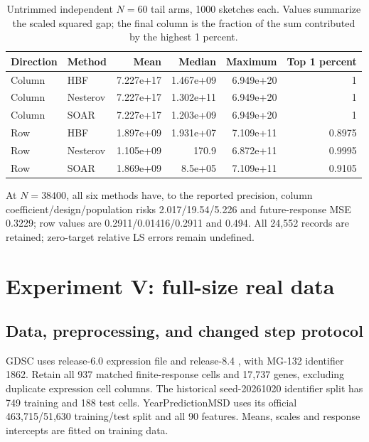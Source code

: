 \documentclass[11pt,a4paper,leqno]{article}
\numberwithin{equation}{section}
\numberwithin{figure}{section}
\numberwithin{table}{section}
\theoremstyle{plain}
\theoremstyle{definition}
\theoremstyle{remark}
\begin{document}
\begin{table}[!htbp]\centering\small
\caption{Untrimmed independent $N=60$ tail arms, 1000 sketches each. Values summarize the scaled squared gap; the final column is the fraction of the sum contributed by the highest 1 percent.}
\label{tab:exp4_tails}
\begin{tabular}{llrrrr}\toprule
Direction & Method & Mean & Median & Maximum & Top 1 percent \\\midrule
Column & HBF & 7.227e+17 & 1.467e+09 & 6.949e+20 & 1 \\
Column & Nesterov & 7.227e+17 & 1.302e+11 & 6.949e+20 & 1 \\
Column & SOAR & 7.227e+17 & 1.203e+09 & 6.949e+20 & 1 \\
Row & HBF & 1.897e+09 & 1.931e+07 & 7.109e+11 & 0.8975 \\
Row & Nesterov & 1.105e+09 & 170.9 & 6.872e+11 & 0.9995 \\
Row & SOAR & 1.869e+09 & 8.5e+05 & 7.109e+11 & 0.9105 \\
\bottomrule\end{tabular}
\end{table}


At $N=38400$, all six methods have, to the reported precision, column
coefficient/design/population risks 2.017/19.54/5.226 and future-response
MSE 0.3229; row values are 0.2911/0.01416/0.2911 and 0.494.
All 24,552 records are retained; zero-target relative LS errors remain undefined.



\section{Experiment V: full-size real data}
\label{supp:sec:native_exp5}
\subsection{Data, preprocessing, and changed step protocol}
\label{supp:subsec:real_protocol}
GDSC uses release-6.0 expression file
 and release-8.4
, with MG-132
identifier 1862. Retain all 937 matched finite-response cells and 17,737
genes, excluding duplicate expression cell columns.
The historical seed-20261020 identifier split has 749 training and 188
test cells.
YearPredictionMSD uses its official 463,715/51,630 training/test split
and all 90 features. Means, scales and response intercepts are fitted on
training data.
\end{document}

